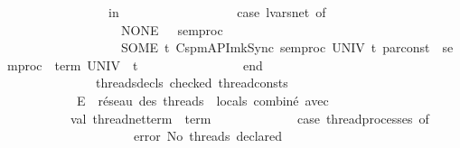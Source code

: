 \begin{isabellebody}
\ \ \ \ \ \ \ \ \ \ \ \ \ \ \ \ in\isanewline
\ \ \ \ \ \ \ \ \ \ \ \ \ \ \ \ \ \ case\ lvars{\isacharunderscore}{\kern0pt}net\ of\ \isanewline
\ \ \ \ \ \ \ \ \ \ \ \ \ \ \ \ \ \ NONE\ {\isacharequal}{\kern0pt}{\isachargreater}{\kern0pt}\ \ sem{\isacharunderscore}{\kern0pt}proc\ \isanewline
\ \ \ \ \ \ \ \ \ \ \ \ \ \ \ \ \ \ {\isacharbar}{\kern0pt}SOME\ t\ {\isacharequal}{\kern0pt}{\isachargreater}{\kern0pt}Cspm{\isacharunderscore}{\kern0pt}API{\isachardot}{\kern0pt}mk{\isacharunderscore}{\kern0pt}Sync\ sem{\isacharunderscore}{\kern0pt}proc\ UNIV{\isacharunderscore}{\kern0pt}\ t{\isacharparenleft}{\kern0pt}{\isacharasterisk}{\kern0pt}\ par{\isacharunderscore}{\kern0pt}const\ {\isachardollar}{\kern0pt}\ sem{\isacharunderscore}{\kern0pt}proc\ {\isachardollar}{\kern0pt}\ {\isacharat}{\kern0pt}{\isacharbraceleft}{\kern0pt}term\ UNIV{\isacharbraceright}{\kern0pt}\ {\isachardollar}{\kern0pt}\ t{\isacharasterisk}{\kern0pt}{\isacharparenright}{\kern0pt}\isanewline
\ \ \ \ \ \ \ \ \ \ \ \ \ \ \ \ end{\isacharparenright}{\kern0pt}\isanewline
\ \ \ \ \ \ \ \ \ \ \ \ \ \ {\isacharparenleft}{\kern0pt}{\isacharhash}{\kern0pt}threads{\isacharunderscore}{\kern0pt}decls\ checked{\isacharcomma}{\kern0pt}\ thread{\isacharunderscore}{\kern0pt}consts{\isacharparenright}{\kern0pt}\isanewline
\ \ \ \ \ \ \ \ \ \ \ \ \ \isanewline
\ \ \ \ \ \ \ \ \ \ {\isacharparenleft}{\kern0pt}{\isacharasterisk}{\kern0pt}\ E{\isachardot}{\kern0pt}\ \ réseau\ des\ threads\ {\isacharparenleft}{\kern0pt}{\isacharplus}{\kern0pt}\ locals{\isacharparenright}{\kern0pt}\ combiné\ avec\ \ {\isacharbar}{\kern0pt}{\isacharbar}{\kern0pt}{\isacharbar}{\kern0pt}\ {\isacharminus}{\kern0pt}{\isacharminus}{\kern0pt}{\isacharminus}{\kern0pt}{\isacharminus}{\kern0pt}{\isacharminus}{\kern0pt}{\isacharminus}{\kern0pt}{\isacharminus}{\kern0pt}{\isacharminus}{\kern0pt}{\isacharminus}{\kern0pt}{\isacharminus}{\kern0pt}{\isacharminus}{\kern0pt}{\isacharminus}{\kern0pt}{\isacharminus}{\kern0pt}{\isacharminus}{\kern0pt}{\isacharminus}{\kern0pt}{\isacharminus}{\kern0pt}{\isacharminus}{\kern0pt}\ {\isacharasterisk}{\kern0pt}{\isacharparenright}{\kern0pt}\isanewline
\ \ \ \ \ \ \ \ \ \ val\ thread{\isacharunderscore}{\kern0pt}net{\isacharunderscore}{\kern0pt}term\ {\isacharcolon}{\kern0pt}\ term\ {\isacharequal}{\kern0pt}\isanewline
\ \ \ \ \ \ \ \ \ \ \ \ {\isacharparenleft}{\kern0pt}case\ thread{\isacharunderscore}{\kern0pt}processes\ of\isanewline
\ \ \ \ \ \ \ \ \ \ \ \ \ \ \ \ {\isacharbrackleft}{\kern0pt}{\isacharbrackright}{\kern0pt}\ \ \ {\isacharequal}{\kern0pt}{\isachargreater}{\kern0pt}\ error\ {\isachardoublequote}{\kern0pt}No\ threads\ declared{\isachardoublequote}{\kern0pt}\isanewline

\end{isabellebody}
